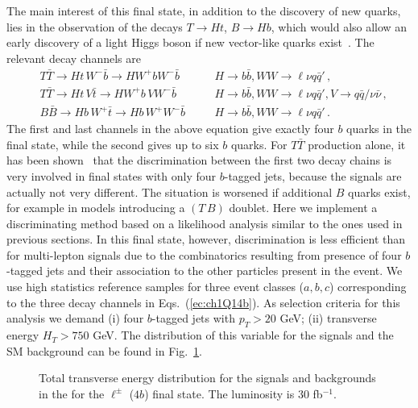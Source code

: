 \documentclass[12pt,a4paper]{article}
\newcommand{\TT}{T \bar T}
\newcommand{\HZ}{V}
\newcommand{\TB}{(T \, B)}
\begin{document}
The main interest of this final state, in addition to the discovery of new quarks, lies in the observation of the decays $T \to Ht$, $B \to Hb$, which would also allow an early discovery of a light Higgs boson if new vector-like quarks exist~\cite{delAguila:1989ba,delAguila:1989rq,AguilarSaavedra:2006gw,Sultansoy:2006cw}. The relevant decay channels are
\begin{align}
& T \bar T \to Ht \, W^- \bar b \to H W^+b W^- \bar b
&& \quad H \to b \bar b , WW \to \ell \nu q \bar q' \,, \nonumber \\
& T \bar T \to Ht \, \HZ \bar t \to H W^+b \, \HZ W^- \bar b
&& \quad H \to b \bar b , WW \to \ell \nu q \bar q' , \HZ \to q \bar q/\nu \bar \nu \,, \nonumber \\
& B \bar B \to H b \, W^+ \bar t \to H b \, W^+ W^- \bar b
&& \quad H \to b \bar b , WW \to \ell \nu q \bar q' \,.
\label{ec:ch1Q14b}
\end{align}
The first and last channels in the above equation give exactly four $b$ quarks in the final state, while the second gives up to six $b$ quarks. For $\TT$ production alone, it has been shown~\cite{AguilarSaavedra:2006gw} that the discrimination between the first two decay chains is very involved in final states with only four $b$-tagged jets, because the signals are actually not very different. The situation is worsened if additional $B$ quarks exist, for example in models introducing a $\TB$ doublet.
Here we implement a discriminating method based on a likelihood analysis similar to the ones used in previous sections.
In this final state, however, discrimination is less efficient than for multi-lepton signals due to the combinatorics resulting from presence of four $b$-tagged jets and their association to the other particles present in the event.
We use high statistics reference samples for three event classes ($a,b,c$) corresponding to the three decay channels in Eqs.~(\ref{ec:ch1Q14b}).
As selection criteria for this analysis we demand (i) four $b$-tagged jets with $p_T > 20$ GeV; (ii) transverse energy $H_T > 750$ GeV. The distribution of this variable for the signals and the SM background can be found in Fig.~\ref{fig:dist-1Q1-4b}.
%
\begin{figure}[t]
\begin{center}
\caption{Total transverse energy distribution for the signals and backgrounds in the
for the $\ell^\pm$ ($4b$) final state. The luminosity is 30 fb$^{-1}$.}
\label{fig:dist-1Q1-4b}
\end{center}
\end{figure}
\end{document}
